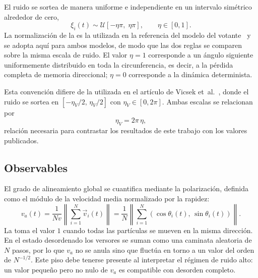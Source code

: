 \documentclass[11pt,a4paper]{article}
\begin{document}
El ruido se sortea de manera uniforme e independiente en un intervalo simétrico
alrededor de cero,
%
\begin{equation}
\label{eq:ruido}
\xi_i(t) \sim \mathcal{U}\!\left[-\eta\pi,\; \eta\pi\right],
\qquad \eta \in [0,1].
\end{equation}
%
La normalización de la  es la utilizada en la referencia del
modelo del votante~\cite{loscar2021} y se adopta aquí para ambos modelos, de modo
que las dos reglas se comparen sobre la misma escala de ruido. El valor
$\eta = 1$ corresponde a un ángulo siguiente uniformemente distribuido en toda la
circunferencia, es decir, a la pérdida completa de memoria direccional;
$\eta = 0$ corresponde a la dinámica determinista.

Esta convención difiere de la utilizada en el artículo de Vicsek
et~al.~\cite{vicsek1995}, donde el
ruido se sortea en $[-\eta_V/2,\, \eta_V/2]$ con $\eta_V \in [0, 2\pi]$. Ambas
escalas se relacionan por
%
\begin{equation}
\label{eq:conversion}
\eta_V = 2\pi\,\eta,
\end{equation}
%
relación necesaria para contrastar los resultados de este trabajo con los valores
publicados.

\subsection{Observables}

El grado de alineamiento global se cuantifica mediante la polarización, definida
como el módulo de la velocidad media normalizado por la rapidez:
%
\begin{equation}
\label{eq:polarizacion}
v_a(t) = \frac{1}{N v} \left\| \sum_{i=1}^{N} \vec{v}_i(t) \right\|
       = \frac{1}{N} \left\| \sum_{i=1}^{N} \left(\cos\theta_i(t),\, \sin\theta_i(t)\right) \right\|.
\end{equation}
%
La  toma el valor $1$ cuando todas las partículas se
mueven en la misma dirección. En el estado desordenado los versores se suman como
una caminata aleatoria de $N$ pasos, por lo que $v_a$ no se anula sino que
fluctúa en torno a un valor del orden de $N^{-1/2}$. Este piso debe tenerse
presente al interpretar el régimen de ruido alto: un valor pequeño pero no nulo
de $v_a$ es compatible con desorden completo.
\end{document}
